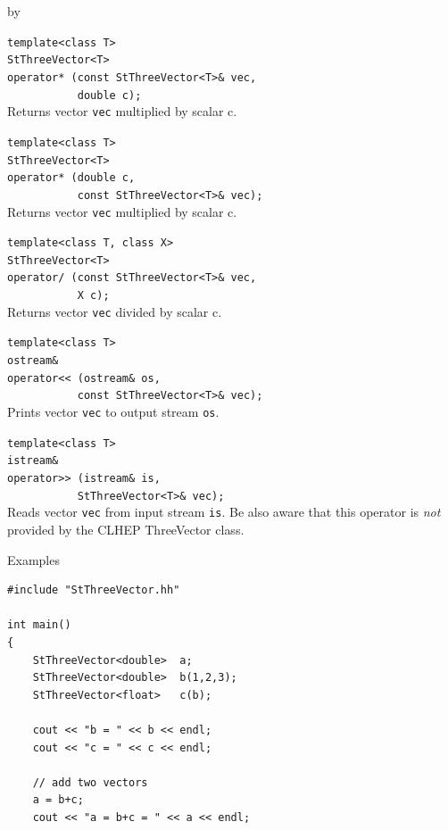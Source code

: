 \documentclass[twoside]{article}
\newcommand{\comp}[1]{\texttt{#1}}%
\newcommand{\entrylabel}[1]{\mbox{\textbf{{#1}}}\hfil}%
\newenvironment{entry}
{\begin{list}{}%
    {\renewcommand{\makelabel}{\entrylabel}%
     \setlength{\labelwidth}{90pt}%
     \setlength{\leftmargin}{\labelwidth}
     \advance\leftmargin by \labelsep%
      }%
    }%
  {\end{list}}
\newcommand{\Entrylabel}[1]%
{\raisebox{0pt}[1ex][0pt]{\makebox[\labelwidth][l]%
    {\parbox[t]{\labelwidth}{\hspace{0pt}\textbf{{#1}}}}}}
\newenvironment{Entry}%
{\renewcommand{\entrylabel}{\Entrylabel}\begin{entry}}%
  {\end{entry}}
\begin{document}
\begin{Entry}
    \verb+template<class T>+\\
    \verb+StThreeVector<T>+\\
    \verb+operator* (const StThreeVector<T>& vec,+\\
    \verb+           double c);+\\
    Returns vector \comp{vec} multiplied by scalar c.
    
    \verb+template<class T>+\\
    \verb+StThreeVector<T>+\\
    \verb+operator* (double c,+\\
    \verb+           const StThreeVector<T>& vec);+\\
    Returns vector \comp{vec} multiplied by scalar c.
    
    \verb+template<class T, class X>+\\
    \verb+StThreeVector<T>+\\
    \verb+operator/ (const StThreeVector<T>& vec,+\\
    \verb+           X c);+\\
    Returns vector \comp{vec} divided by scalar c.

    \verb+template<class T>+\\
    \verb+ostream&+\\
    \verb+operator<< (ostream& os,+\\
    \verb+           const StThreeVector<T>& vec);+\\
    Prints vector \comp{vec} to output stream \comp{os}.
    
    \verb+template<class T>+\\
    \verb+istream&+\\
    \verb+operator>> (istream& is,+\\
    \verb+           StThreeVector<T>& vec);+\\
    Reads vector \comp{vec} from input stream \comp{is}.
    Be also aware that this operator is {\em not} provided by
    the CLHEP ThreeVector class.

\item[Examples]
{\footnotesize
\begin{verbatim}
#include "StThreeVector.hh"

int main()
{
    StThreeVector<double>  a;
    StThreeVector<double>  b(1,2,3);
    StThreeVector<float>   c(b);

    cout << "b = " << b << endl;
    cout << "c = " << c << endl;

    // add two vectors
    a = b+c;
    cout << "a = b+c = " << a << endl;


\end{verbatim}}
\end{Entry}
\end{document}
